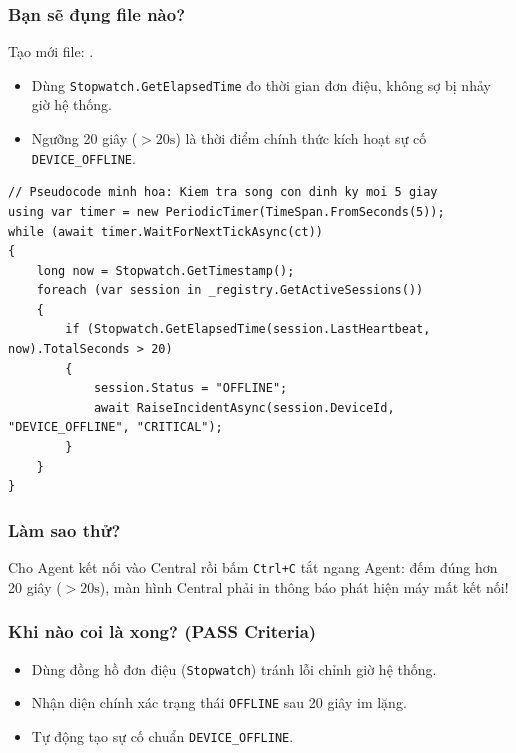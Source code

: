 \documentclass[12pt,a4paper]{article}
\begin{document}
\subsubsection{Bạn sẽ đụng file nào?}
Tạo mới file: .

\begin{orientationbox}
\begin{itemize}[leftmargin=1.5em, itemsep=1pt]
  \item Dùng \texttt{Stopwatch.GetElapsedTime} đo thời gian đơn điệu, không sợ bị nhảy giờ hệ thống.
  \item Ngưỡng 20 giây ($> 20\text{s}$) là thời điểm chính thức kích hoạt sự cố \texttt{DEVICE\_OFFLINE}.
\end{itemize}
\end{orientationbox}

\begin{lstlisting}[language=CSharp, caption={Pseudocode minh họa: Quét định kỳ phát hiện máy quá hạn nhịp tim}]
// Pseudocode minh hoa: Kiem tra song con dinh ky moi 5 giay
using var timer = new PeriodicTimer(TimeSpan.FromSeconds(5));
while (await timer.WaitForNextTickAsync(ct))
{
    long now = Stopwatch.GetTimestamp();
    foreach (var session in _registry.GetActiveSessions())
    {
        if (Stopwatch.GetElapsedTime(session.LastHeartbeat, now).TotalSeconds > 20)
        {
            session.Status = "OFFLINE";
            await RaiseIncidentAsync(session.DeviceId, "DEVICE_OFFLINE", "CRITICAL");
        }
    }
}
\end{lstlisting}

\subsubsection{Làm sao thử?}
Cho Agent kết nối vào Central rồi bấm \texttt{Ctrl+C} tắt ngang Agent: đếm đúng hơn 20 giây ($> 20\text{s}$), màn hình Central phải in thông báo phát hiện máy mất kết nối!

\subsubsection{Khi nào coi là xong? (PASS Criteria)}
\begin{itemize}
  \item Dùng đồng hồ đơn điệu (\texttt{Stopwatch}) tránh lỗi chỉnh giờ hệ thống.
  \item Nhận diện chính xác trạng thái \texttt{OFFLINE} sau 20 giây im lặng.
  \item Tự động tạo sự cố chuẩn \texttt{DEVICE\_OFFLINE}.
\end{itemize}
\end{document}
